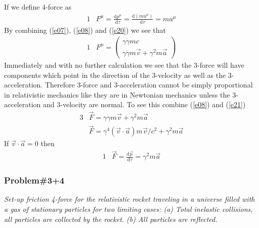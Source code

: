 \documentclass[]{article}
\numberwithin{equation}{subsection}
\begin{document}
\noindent If we define 4-force as
\begin{alignat}{1}
	\label{e20}	&F^{\mu}=\frac{\mathrm{d}p^{\mu}}{\mathrm{d}\tau}=\frac{\mathrm{d}(mu^{\mu})}{\mathrm{d}\tau}=ma^{\mu}
\end{alignat}
By combining (\ref{e07}), (\ref{e08}) and (\ref{e20}) we see that
\begin{alignat}{1}
	\label{e21}	&F^{\mu}=
	\begin{pmatrix}
		\gamma\dot{\gamma}mc\\
		\gamma\dot{\gamma}m\vec{v}+\gamma^{2}m\vec{a}
	\end{pmatrix}
\end{alignat}
Immediately and with no further calculation we see that the 3-force will have components which point in the direction of the 3-velocity as well as the 3-acceleration. Therefore 3-force and 3-acceleration cannot be simply proportional in relativistic mechanics like they are in Newtonian mechanics unless the 3-acceleration and 3-velocity are normal. To see this combine (\ref{e08}) and (\ref{e21})
\begin{alignat}{3}
	\label{e22}	&\vec{F}=\gamma\dot{\gamma}m\vec{v}+\gamma^{2}m\vec{a}\\
	\label{e23}	&\vec{F}=\gamma^{4}(\vec{v}\cdot\vec{a})m\vec{v}/c^{2}+\gamma^{2}m\vec{a}
\end{alignat}
If $\vec{v}\cdot\vec{a}=0$ then
\begin{alignat}{1}
	\label{e24}	&\vec{F}=\frac{\mathrm{d}\vec{p}}{\mathrm{d}\tau}=\gamma^{2}m\vec{a}
\end{alignat}
\subsubsection*{Problem\#3+4}  
\emph{Set-up friction 4-force for the relativistic rocket traveling in a universe filled with a gas of stationary particles for two limiting cases: (a) Total inelastic collisions, all particles are collected by the rocket. (b) All particles are reflected.}\\  
\end{document}
